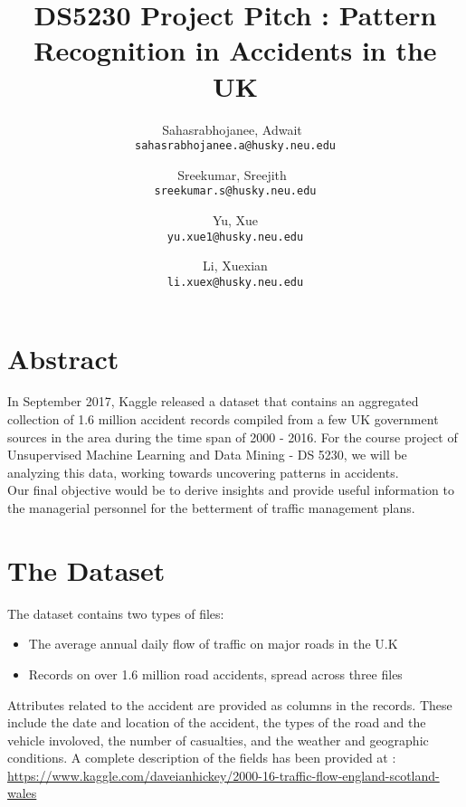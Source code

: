 \documentclass[a4paper, 11pt]{article}
\begin{document}
\title{DS5230 Project Pitch : Pattern Recognition in Accidents in the UK}


\author{
  Sahasrabhojanee, Adwait\ \\     \texttt{sahasrabhojanee.a@husky.neu.edu}
  \and
  Sreekumar, Sreejith\  \\ \texttt{sreekumar.s@husky.neu.edu}
  \and
  Yu, Xue \\  \texttt{yu.xue1@husky.neu.edu}
  \and
  Li, Xuexian  \\ \texttt{li.xuex@husky.neu.edu}
}
\maketitle
\section{Abstract}
In September 2017, Kaggle released a dataset that contains an aggregated collection of 1.6 million accident records compiled from a few UK government sources in the area during the time span of 2000 - 2016. For the course project of Unsupervised Machine Learning and Data Mining - DS 5230, we will be analyzing this data, working towards uncovering patterns in accidents. \\

   Our final objective would be to derive insights and provide useful information to the managerial personnel for the betterment of traffic management plans. \\

   \section{The Dataset}
   The dataset contains two types of files:

   \begin{itemize}
     \item The average annual daily flow of traffic on major roads in the U.K
     \item Records on over 1.6 million road accidents, spread across three files
   \end{itemize}
   Attributes related to the accident are provided as columns in the records. These include the date and location of the accident, the types of the road and the vehicle involoved, the number of casualties, and the weather and geographic conditions. A complete description of the fields has been provided at : \url{https://www.kaggle.com/daveianhickey/2000-16-traffic-flow-england-scotland-wales}
   
\end{document}

